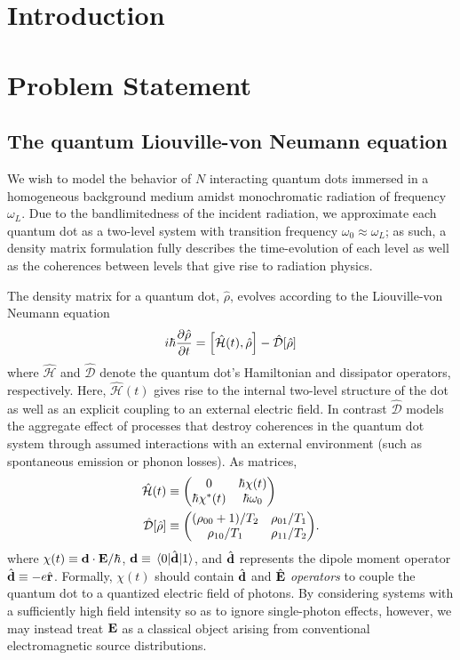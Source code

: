 \documentclass[conference]{IEEEtran}
\begin{document}
\IEEEpeerreviewmaketitle

\section{Introduction}


\section{Problem Statement}

\subsection{The quantum Liouville-von Neumann equation}
We wish to model the behavior of $N$ interacting quantum dots immersed in a homogeneous background medium amidst monochromatic radiation of frequency $\omega_L$.
Due to the bandlimitedness of the incident radiation, we approximate each quantum dot as a two-level system with transition frequency $\omega_0 \approx \omega_L$; as such, a density matrix formulation fully describes the time-evolution of each level as well as the coherences between levels that give rise to radiation physics.

The density matrix for a quantum dot, $\hat{\rho}$, evolves according to the Liouville-von Neumann equation
\begin{equation}
  i \hbar \pdv{\hat{\rho}}{t} = \commutator{\hat{\mathcal{H}}(t)}{\hat{\rho}} - \hat{\mathcal{D}}\qty[\hat{\rho}]
  \label{eq:liouville}
\end{equation}
where $\hat{\mathcal{H}}$ and $\hat{\mathcal{D}}$ denote the quantum dot's Hamiltonian and dissipator operators, respectively.
Here, $\hat{\mathcal{H}}(t)$ gives rise to the internal two-level structure of the dot as well as an explicit coupling to an external electric field.
In contrast $\hat{\mathcal{D}}$ models the aggregate effect of processes that destroy coherences in the quantum dot system through assumed interactions with an external environment (such as spontaneous emission or phonon losses).
As matrices,
\begin{subequations}
  \begin{align}
    \hat{\mathcal{H}}(t) &\equiv \mqty(0 & \hbar \chi(t) \\ \hbar \chi^*(t) & \hbar \omega_0) \label{eq:hamiltonian} \\
    \hat{\mathcal{D}}[\hat{\rho}] &\equiv \mqty((\rho_{00} + 1)/T_2 & \rho_{01}/T_1 \\ \rho_{10}/T_1 & \rho_{11}/T_2). \label{eq:dissipator}
  \end{align}
\end{subequations}
where $\chi(t) \equiv \vb{d} \cdot \vb{E}/\hbar$, $\vb{d} \equiv \matrixel{0}{\hat{\vb{d}}}{1}$, and $\hat{\vb{d}}$ represents the dipole moment operator $\hat{\vb{d}} \equiv -e \hat{\vb{r}}$. 
Formally, $\chi(t)$ should contain $\hat{\vb{d}}$ and $\hat{\vb{E}}$ \emph{operators} to couple the quantum dot to a quantized electric field of photons.
By considering systems with a sufficiently high field intensity so as to ignore single-photon effects, however, we may instead treat $\vb{E}$ as a classical object arising from conventional electromagnetic source distributions.
\end{document}
